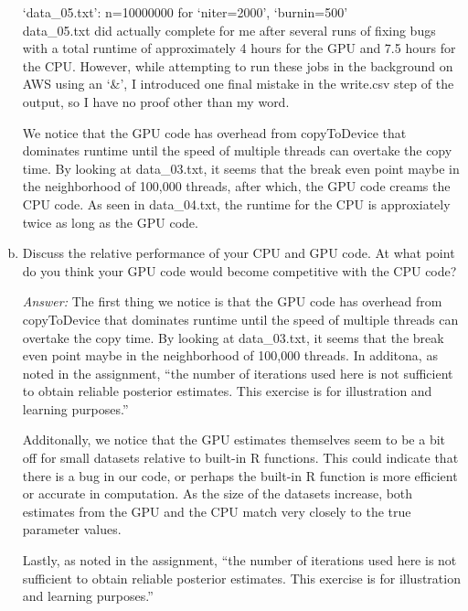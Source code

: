 \documentclass[a4paper, 11pt]{report}
\begin{document}
\begin{enumerate}[a)]
		    `data\_05.txt': n=10000000 for `niter=2000', `burnin=500' \\
		    data\_05.txt did actually complete for me after several runs of fixing bugs with a total runtime of approximately 4 hours for the GPU and 7.5 hours for the CPU.  However, while attempting to run these jobs in the background on AWS using an `\&', I introduced one final mistake in the write.csv step of the output, so I have no proof other than my word.
		    
		    We notice that the GPU code has overhead from copyToDevice that dominates runtime until the speed of multiple threads can overtake the copy time.  By looking at data\_03.txt, it seems that the break even point maybe in the neighborhood of 100,000 threads, after which, the GPU code creams the CPU code.  As seen in data\_04.txt, the runtime for the CPU is approxiately twice as long as the GPU code.
		    
		\item Discuss the relative performance of your CPU and GPU code. At what point do you think your GPU code would become competitive with the CPU code?
		
			\textit{Answer:} The first thing we notice is that the GPU code has overhead from copyToDevice that dominates runtime until the speed of multiple threads can overtake the copy time.  By looking at data\_03.txt, it seems that the break even point maybe in the neighborhood of 100,000 threads.  In additona, as noted in the assignment, ``the number of iterations used here is not sufficient to obtain reliable posterior estimates. This exercise is for illustration and learning purposes.''
			
			Additonally, we notice that the GPU estimates themselves seem to be a bit off for small datasets relative to built-in R functions.  This could indicate that there is a bug in our code, or perhaps the built-in R function is more efficient or accurate in computation.  As the size of the datasets increase, both estimates from the GPU and the CPU match very closely to the true parameter values.
			
			Lastly, as noted in the assignment, ``the number of iterations used here is not sufficient to obtain reliable posterior estimates. This exercise is for illustration and learning purposes.''
		
	\end{enumerate}


	
	\newpage
	
\end{document}
